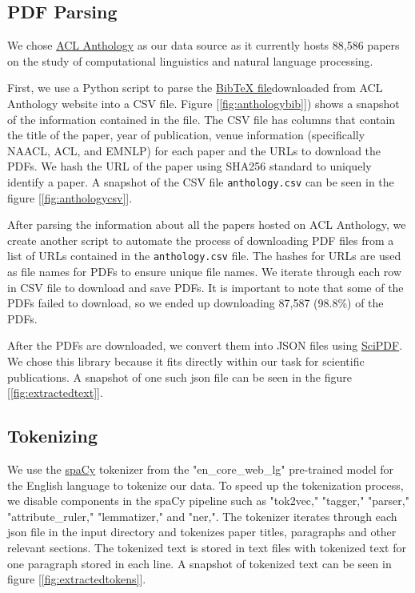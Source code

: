 \documentclass[11pt]{article}
\begin{document}
\subsection{PDF Parsing}
We chose \hyperlink{https://aclanthology.org/}{ACL Anthology} as our data source as it currently hosts 88,586 papers on the study of computational linguistics and natural language processing. 

First, we use a Python script to parse the \href{https://aclanthology.org/anthology.bib.gz}{BibTeX file}downloaded from ACL Anthology website into a CSV file. Figure [\ref{fig:anthologybib}]) shows a snapshot of the information contained in the file. The CSV file has columns that contain the title of the paper, year of publication, venue information (specifically NAACL, ACL, and EMNLP) for each paper and the URLs to download the PDFs. We hash the URL of the paper using SHA256 standard to uniquely identify a paper. A snapshot of the CSV file \texttt{anthology.csv} can be seen in the figure [\ref{fig:anthologycsv}].

After parsing the information about all the papers hosted on ACL Anthology, we create another script to automate the process of downloading PDF files from a list of URLs contained in the \texttt{anthology.csv} file. The hashes for URLs are used as file names for PDFs to ensure unique file names. We iterate through each row in CSV file to download and save PDFs. It is important to note that some of the PDFs failed to download, so we ended up downloading 87,587 (98.8\%) of the PDFs.

After the PDFs are downloaded, we convert them into JSON files using \href{https://github.com/titipata/scipdf_parser}{SciPDF}. We chose this library because it fits directly within our task for scientific publications. A snapshot of one such json file can be seen in the figure [\ref{fig:extractedtext}].

\subsection{Tokenizing}
We use the \href{https://spacy.io}{spaCy} tokenizer from the "en\_core\_web\_lg" pre-trained model for the English language to tokenize our data. To speed up the tokenization process, we disable components in the spaCy pipeline such as "tok2vec," "tagger," "parser," "attribute\_ruler," "lemmatizer," and "ner,". The tokenizer iterates through each json file in the input directory and tokenizes paper titles, paragraphs and other relevant sections. The tokenized text is stored in text files with tokenized text for one paragraph stored in each line. A snapshot of tokenized text can be seen in figure [\ref{fig:extractedtokens}].
\end{document}
